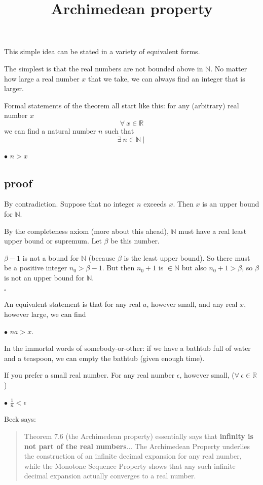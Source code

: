 \documentclass[11pt, oneside]{article}
\title{Archimedean property}
\date{}
\begin{document}
\maketitle
\Large


This simple idea can be stated in a variety of equivalent forms.

The simplest is that the real numbers are not bounded above in $\mathbb{N}$.  No matter how large a real number $x$ that we take, we can always find an integer that is larger.

Formal statements of the theorem all start like this:  for any (arbitrary) real number $x$
\[ \forall \ x \in \mathbb{R} \]
we can find a natural number $n$ such that
\[ \exists \ n \in \mathbb{N} \ | \ \]

$\bullet$  $n > x$

\subsection*{proof}

By contradiction.  Suppose that no integer $n$ exceeds $x$.  Then $x$ is an upper bound for $\mathbb{N}$.

By the completeness axiom (more about this ahead), $\mathbb{N}$ must have a real least upper bound or supremum.  Let $\beta$ be this number.  

$\beta - 1$ is not a bound for $\mathbb{N}$ (because $\beta$ is the least upper bound).  So there must be a positive integer $n_0 > \beta - 1$.  But then $n_0 + 1$ is $\in \mathbb{N}$ but also $n_0 + 1 > \beta$, so $\beta$ is not an upper bound for $\mathbb{N}$.

$\square$

An equivalent statement is that for any real $a$, however small, and any real $x$, however large, we can find 

$\bullet$  $na > x$.

In the immortal words of somebody-or-other:  if we have a bathtub full of water and a teaspoon, we can empty the bathtub (given enough time).

If you prefer a small real number.  For any real number $\epsilon$, however small, ($\forall \ \epsilon \in \mathbb{R}$)

$\bullet$  $\frac{1}{n} < \epsilon$

Beck says:

\begin{quote}Theorem 7.6 (the Archimedean property) essentially says that \textbf{infinity is not part of the real numbers}... The Archimedean Property underlies the construction of an infinite decimal expansion for any real number, while the Monotone Sequence Property shows that any such infinite decimal expansion actually converges to a real number.\end{quote}
\end{document}
